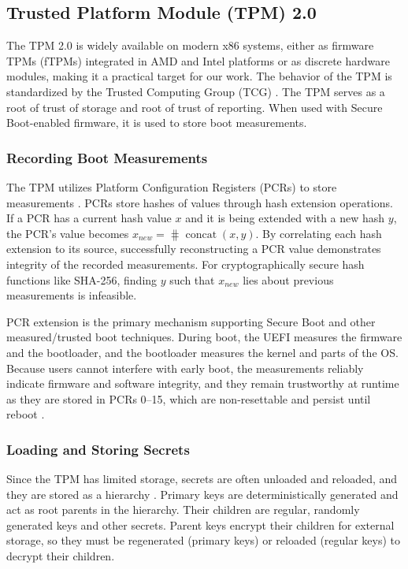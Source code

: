 \documentclass[12pt,letterpaper]{kuthesis}
\newif\ifthesis
\begin{document}
\ifthesis
\subsection{Booting a Linux System}

\fi

\subsection{Trusted Platform Module (TPM) 2.0}
The TPM 2.0 is widely available on modern x86 systems,
either as firmware TPMs (fTPMs) integrated in AMD and Intel platforms or as discrete hardware modules,
making it a practical target for our work.
The behavior of the TPM is standardized by the Trusted Computing Group (TCG) \cite{Trusted-Computing-Group:2025:TPM-2.0-Library}.
The TPM serves as a root of trust of storage and root of trust of reporting.
When used with Secure Boot-enabled firmware, it is used to store boot measurements.

\subsubsection{Recording Boot Measurements}
The TPM utilizes Platform Configuration Registers (PCRs) to store measurements \cite{Trusted-Computing-Group:2025:TCG-TPM-2.0-Part1-Architecture}.
PCRs store hashes of values through hash extension operations.
If a PCR has a current hash value $x$ and it is being extended with a new hash $y$,
the PCR's value becomes $x_{new} = \hash{\mathop{concat}(x,y)}$.
By correlating each hash extension to its source,
successfully reconstructing a PCR value demonstrates integrity of the recorded measurements.
For cryptographically secure hash functions like SHA-256,
finding $y$ such that $x_{new}$ lies about previous measurements is infeasible.

PCR extension is the primary mechanism supporting Secure Boot and other measured/trusted boot techniques.
During boot, the UEFI measures the firmware and the bootloader,
and the bootloader measures the kernel and parts of the OS.
Because users cannot interfere with early boot,
the measurements reliably indicate firmware and software integrity,
and they remain trustworthy at runtime as they are stored in PCRs 0--15, which are non-resettable and persist until reboot \cite{Trusted-Computing-Group:2023:TCG-PC-Client-PFP}.

\subsubsection{Loading and Storing Secrets}
Since the TPM has limited storage, secrets are often unloaded and reloaded,
and they are stored as a hierarchy \cite{Arthur:2015:A-Practical-Guide-to-TPM-2.0-Certifying-Keys,Trusted-Computing-Group:2025:TCG-TPM-2.0-Part1-Architecture}.
Primary keys are deterministically generated and act as root parents in the hierarchy.
Their children are regular, randomly generated keys and other secrets.
Parent keys encrypt their children for external storage,
so they must be regenerated (primary keys) or reloaded (regular keys) to decrypt their children.
\end{document}
